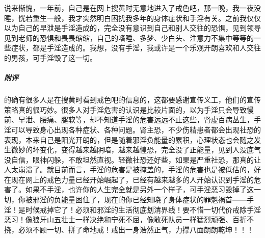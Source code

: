 \begin{case}
    说来惭愧，一年前，自己是在网上搜黄时无意地进入了戒色吧，那一晚，我一夜没睡，恍若重生一般，我才突然明白困扰我多年的身体症状和手淫有关。之前我仅仅以为自己的早泄是手淫造成的，完全没有意识到自己和别人交往的恐惧，见到领导见到老师的恐惧和畏畏缩缩，自己的嗜睡、多梦、少白头、注意力不集中等等的一些症状，都是手淫造成的。我想，没有手淫，我或许是一个乐观开朗喜欢和人交往的男孩，可手淫毁了这一切。
    \subparagraph{附评} 的确有很多人是在搜黄时看到戒色吧的信息的，这都要感谢宣传义工，他们的宣传策略真的很巧妙。很多人对手淫危害的认识是比较片面的，以为手淫只会导致慢前、早泄、腰痛、腿软等，却不知道手淫的危害远远不止这些，肾虚百病丛生，手淫可以导致身心出现各种症状、各种问题。肾主恐，不少伤精患者都会出现社恐的表现，本来自己是阳光开朗的，但是随着邪淫负能量的累积，心理状态也会随之发生微妙的坏变化，变得越来越阴暗，越来越惶恐，完全没了正能量，见到人没底气没自信，眼神闪躲，不敢坦然直视。轻微社恐还好些，如果是严重社恐，那真的让人太崩溃了。就目前而言，手淫的危害是被掩盖的，手淫的危害也是被低估的，好在现在网上的戒色力量已经开始崛起了，已经有越来越多的人开始认识到手淫的危害了。如果不手淫，也许你的人生完全就是另外一个样子，可手淫恶习毁掉了这一切，你被邪淫的负能量困住了，现在的你已经知晓了身体症状的罪魁祸首——手淫！是时候戒掉它了！必须和邪淫的生活彻底划清界线！要不惜一切代价戒除手淫恶习！像狼牙山五壮士一样决绝和宁死不屈，像敢死队员一样猛烈顽强、百折不挠，必须不顾一切、拼了命地戒！戒出一身浩然正气，力撑八面朗朗乾坤！！！
\end{case}

